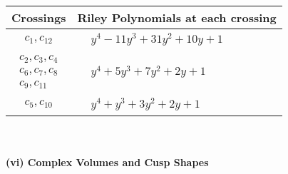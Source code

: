 \documentclass[1p]{elsarticle_modified}
\theoremstyle{definition}
\begin{document}
\begin{tabular}{m{50pt}|m{274pt}}
Crossings & \hspace{64pt}Riley Polynomials at each crossing \\
\hline $$\begin{aligned}c_{1},c_{12}\end{aligned}$$&$\begin{aligned}
&y^4-11 y^3+31 y^2+10 y+1
\end{aligned}$\\
\hline $$\begin{aligned}c_{2},c_{3},c_{4}\\c_{6},c_{7},c_{8}\\c_{9},c_{11}\end{aligned}$$&$\begin{aligned}
&y^4+5 y^3+7 y^2+2 y+1
\end{aligned}$\\
\hline $$\begin{aligned}c_{5},c_{10}\end{aligned}$$&$\begin{aligned}
&y^4+y^3+3 y^2+2 y+1
\end{aligned}$\\
\hline
\end{tabular}\\~\\
\newpage\flushleft \textbf{(vi) Complex Volumes and Cusp Shapes}
\end{document}
